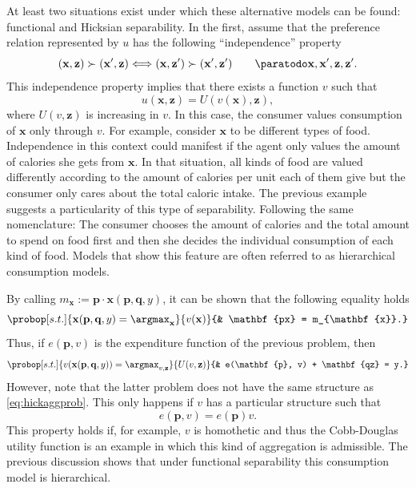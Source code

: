 \documentclass[english, a4paper, 12pt]{article}
\begin{document}
At least two situations exist under which these alternative models can be found: functional and Hicksian separability. In the first, assume that the preference relation represented by $u$ has the following ``independence'' property
	\begin{equation} \label{eq:indepPref}
		(\mathbf{x}, \mathbf{z}) \succ (\mathbf{x}', \mathbf{z}) 
			\Longleftrightarrow
		(\mathbf{x}, \mathbf{z}') \succ (\mathbf{x}', \mathbf{z}') \qquad \paratodo \mathbf{x}, \mathbf{x}', \mathbf{z}, \mathbf{z}'.
	\end{equation}
This independence property implies that there exists a function $v$ such that
	$$u(\mathbf{x}, \mathbf{z}) = U(v(\mathbf{x}), \mathbf{z}),$$
where $U(v,\mathbf{z})$ is increasing in $v$. In this case, the consumer values consumption of $\mathbf{x}$ only through $v$. For example, consider $\mathbf{x}$ to be different types of food. Independence in this context could manifest if the agent only values the amount of calories she gets from $\mathbf{x}$. In that situation, all kinds of food are valued differently according to the amount of calories per unit each of them give but the consumer only cares about the total caloric intake. The previous example suggests a particularity of this type of separability. Following the same nomenclature: The consumer chooses the amount of calories and the total amount to spend on food first and then she decides the individual consumption of each kind of food. Models that show this feature are often referred to as hierarchical consumption models.

By calling $m_{\mathbf{x}} := \mathbf{p}\cdot \mathbf{x}(\mathbf{p}, \mathbf{q}, y)$, it can be shown that the following equality holds
	$$\probop[s.t.]{\mathbf{x}(\mathbf{p}, \mathbf{q}, y) = \argmax_{\mathbf{x}}}{v(\mathbf{x})}
					{&	\mathbf{px} = m_{\mathbf{x}}.}$$
Thus, if $e(\mathbf{p}, v)$ is the expenditure function of the previous problem, then
	$$	\probop[s.t.]{v(\mathbf{x}(\mathbf{p}, \mathbf{q}, y)) = \argmax_{v, \mathbf{z}}}{U(v, \mathbf{z})}
				{&	e(\mathbf{p}, v) + \mathbf{qz} = y.}
	$$
However, note that the latter problem does not have the same structure as \eqref{eq:hickaggprob}. This only happens if $v$ has a particular structure such that 
	$$e(\mathbf{p}, v) = e(\mathbf{p})v.$$
This property holds if, for example, $v$ is homothetic and thus the Cobb-Douglas utility function is an example in which this kind of aggregation is admissible. The previous discussion shows that under functional separability this consumption model is hierarchical.
\end{document}
